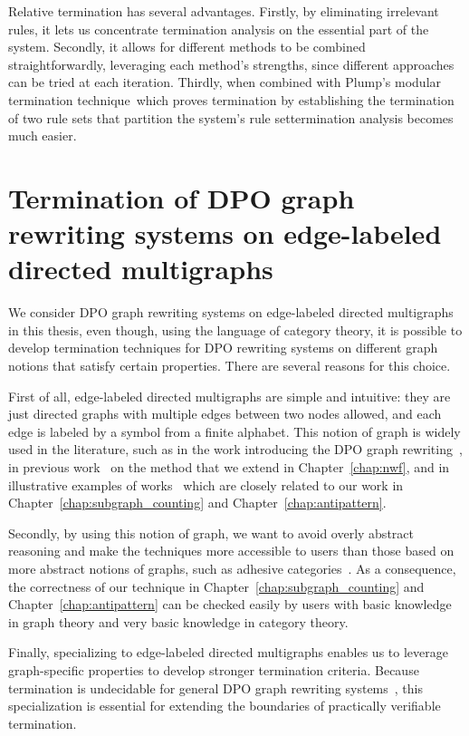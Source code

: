 Relative termination has several advantages.
  Firstly, by eliminating irrelevant rules, it lets us concentrate
  termination analysis on the essential part of the system.
  Secondly, it allows for different methods to be combined straightforwardly, leveraging each method's strengths, since different approaches can be tried at each iteration.
   Thirdly, when combined with Plump's modular termination technique~\cite{plump2018modular}\textemdash which proves termination by establishing the termination of two rule sets that partition the system's rule set\textemdash termination analysis becomes much easier.


\section{Termination of DPO graph rewriting systems on edge-labeled directed multigraphs} 
We consider DPO graph rewriting systems on edge-labeled directed multigraphs in this thesis, even though, using the language of category theory, it is possible to develop termination techniques for DPO rewriting systems on different graph notions that satisfy certain properties. There are several reasons for this choice. 

First of all, edge-labeled directed multigraphs are simple and intuitive: they are just directed graphs with multiple edges between two nodes allowed, and each edge is labeled by a symbol from a finite alphabet. This notion of graph is widely used in the literature, such as in the work introducing the DPO graph rewriting~\cite{ehrig1973graph}, in previous work~\cite{bruggink2014termination,bruggink2015proving,zantema2014termination} on the method that we extend in Chapter~\ref{chap:nwf}, and in illustrative examples of works~\cite{overbeek2024termination_lmcs,endrullis2024generalized_icgt} which are closely related to our work in Chapter~\ref{chap:subgraph_counting} and Chapter~\ref{chap:antipattern}.

 Secondly, by using this notion of graph, we want to avoid overly abstract reasoning and make the techniques more accessible to users than those based on more abstract notions of graphs, such as adhesive categories~\cite{lack2004adhesive}.
 As a consequence, the correctness of our technique in Chapter~\ref{chap:subgraph_counting} and Chapter~\ref{chap:antipattern} can be checked easily by users with basic knowledge in graph theory and very basic knowledge in category theory.

Finally, specializing to edge-labeled directed multigraphs enables us to leverage graph-specific properties to develop stronger termination criteria. Because termination is undecidable for general DPO graph rewriting systems~\cite{plump1998terminationundecidable}, this specialization is essential for extending the boundaries of practically verifiable termination. 

